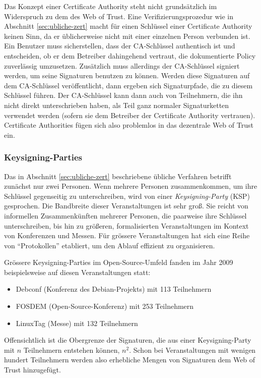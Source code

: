Das Konzept einer Certificate Authority steht nicht grundsätzlich im
Widerspruch zu dem des Web of Trust. Eine Verifizierungsprozedur wie
in Abschnitt \ref{sec:ubliche-zert} macht für einen Schlüssel
einer Certificate Authority keinen Sinn, da er üblicherweise nicht
mit einer einzelnen Person verbunden ist. Ein Benutzer muss
sicherstellen, dass der CA-Schlüssel authentisch ist und
entscheiden, ob er dem Betreiber dahingehend vertraut, die
dokumentierte Policy zuverlässig umzusetzen. Zusätzlich muss
allerdings der CA-Schlüssel signiert werden, um seine Signaturen
benutzen zu können. Werden diese Signaturen auf dem CA-Schlüssel
veröffentlicht, dann ergeben sich Signaturpfade, die zu diesem
Schlüssel führen. Der CA-Schlüssel kann dann auch von
Teilnehmern, die ihn nicht direkt unterschrieben haben, als Teil ganz
normaler Signaturketten verwendet werden (sofern sie dem Betreiber der
Certificate Authority vertrauen). Certificate Authorities fügen sich
also problemlos in das dezentrale Web of Trust ein.

\subsubsection{Keysigning-Parties}
\label{sec:keysigning-parties}

Das in Abschnitt \ref{sec:ubliche-zert} beschriebene übliche Verfahren
betrifft zunächst nur zwei Personen. Wenn mehrere Personen
zusammenkommen, um ihre Schlüssel gegenseitig zu unterschreiben, wird
von einer \emph{Keysigning-Party} (KSP) gesprochen. Die Bandbreite dieser
Veranstaltungen ist sehr groß. Sie reicht von informellen
Zusammenkünften mehrerer Personen, die paarweise ihre Schlüssel
unterschreiben, bis hin zu größeren, formalisierten Veranstaltungen im
Kontext von Konferenzen und Messen. Für grössere
Veranstaltungen hat sich eine Reihe von "`Protokollen"' etabliert, um
den Ablauf effizient zu organisieren\cite{Brennen2008}.\pagebreak[4]

Grössere Keysigning-Parties im Open-Source-Umfeld fanden im Jahr 2009
beispielsweise auf diesen Veranstaltungen statt:
\begin{itemize}
\item Debconf (Konferenz des Debian-Projekts) mit 113 Teilnehmern
\item FOSDEM (Open-Source-Konferenz) mit 253 Teilnehmern
\item LinuxTag (Messe) mit 132 Teilnehmern
\end{itemize}

Offensichtlich ist die Obergrenze der Signaturen, die aus einer
Keysigning-Party mit $n$ Teilnehmern entstehen können, $n^2$. Schon
bei Veranstaltungen mit wenigen hundert Teilnehmern werden also
erhebliche Mengen von Signaturen dem Web of Trust hinzugefügt.

